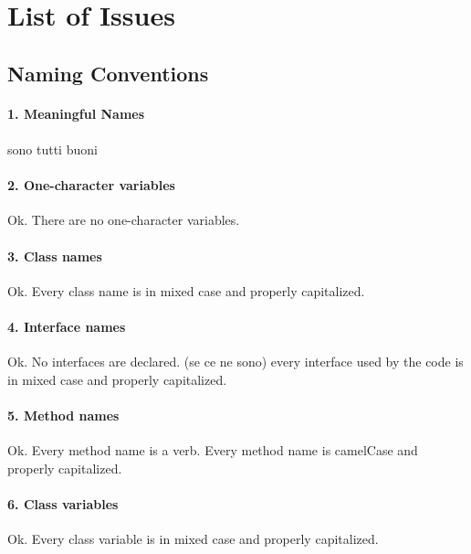 \documentclass[english]{article}
\begin{document}
\section{List of Issues} %

\subsection{Naming Conventions}

\paragraph{1. Meaningful Names}
\paragraph{}
sono tutti buoni

\paragraph{2. One-character variables}

Ok.
There are no one-character variables.

\paragraph{3. Class names}
Ok.
Every class name is in mixed case and properly capitalized.

\paragraph{4. Interface names}
Ok.
No interfaces are declared.
(se ce ne sono) every interface used by the code is in mixed case and properly capitalized.

\paragraph{5. Method names}
Ok.
Every method name is a verb.
Every method name is camelCase and properly capitalized.

\paragraph{6. Class variables}
Ok.
Every class variable is in mixed case and properly capitalized.
\end{document}
